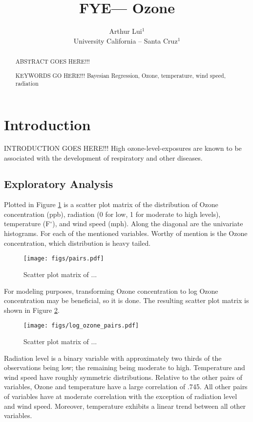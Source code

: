 \documentclass{../../tex_template/asaproc}
\title{FYE--- Ozone}
\author{
  Arthur Lui$^1$\\
  University California -- Santa Cruz$^1$\\
}
\begin{document}
\maketitle
\begin{abstract}
ABSTRACT GOES HERE!!!
\begin{keywords}
KEYWORDS GO HERE!!!
Bayesian Regression, Ozone, temperature, wind speed, radiation
\end{keywords}
\end{abstract}

\section{Introduction}
INTRODUCTION GOES HERE!!!
High ozone-level-exposures are known to be associated with the development of respiratory
and other diseases.


\subsection{Exploratory Analysis}
Plotted in Figure \ref{fig:pairs} is a scatter plot matrix of the distribution of 
Ozone concentration (ppb), radiation (0 for low, 1 for moderate to high levels),
temperature (F$^\circ$), and wind speed (mph). Along the diagonal are the univariate
histograms. For each of the mentioned variables. Worthy of mention is the Ozone
concentration, which distribution is heavy tailed.
\begin{figure}[H]
  \texttt{[image: figs/pairs.pdf]}
  \caption{\small Scatter plot matrix of ... }
  \label{fig:pairs}
\end{figure}
For modeling purposes, transforming Ozone concentration to log Ozone
concentration may be beneficial, so it is done.  The resulting scatter plot
matrix is shown in Figure \ref{fig:logpairs}.
\begin{figure}[H]
  \texttt{[image: figs/log\_ozone\_pairs.pdf]}
  \caption{\small Scatter plot matrix of ... }
  \label{fig:logpairs}
\end{figure}
Radiation level is a binary variable with approximately two thirds of the
observations being low; the remaining being moderate to high.  Temperature and
wind speed have roughly symmetric distributions. Relative to the other pairs of
variables, Ozone and temperature have a large correlation of .745.  All other
pairs of variables have at moderate correlation with the exception of radiation
level and wind speed. Moreover, temperature exhibits a linear trend between
all other variables.
\end{document}
